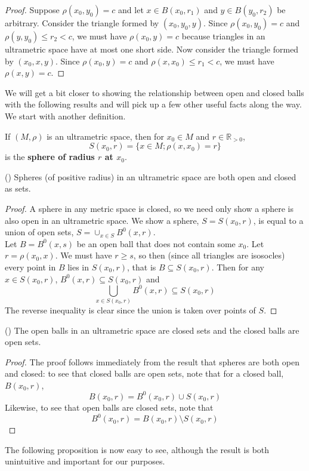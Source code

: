 \begin{proof}
Suppose $\rho(x_0, y_0)=c$ and let $x \in B(x_0, r_1)$ and $y \in B(y_0, r_2)$ be arbitrary. Consider the triangle formed by $(x_0, y_0,y)$. Since $\rho(x_0,y_0)=c$ and  $\rho(y,y_0) \leq r_2 < c$, we must have $\rho(x_0, y)=c$ because triangles in an ultrametric space have at most one short side. Now consider the triangle formed by  $(x_0, x,y)$. Since $\rho(x_0, y)=c$ and  $\rho(x,x_0) \leq r_1 < c$, we must have $\rho(x, y)=c$.
\end{proof}

We will get a bit closer to showing the relationship between open and closed balls with the following results and will pick up a few other useful facts along the way. We start with another definition.\\

\begin{definition}
	If $(M, \rho)$ is an ultrametric space, then for $x_0 \in M$ and $r \in \mathbb{R}_{> 0 }$, \[S(x_0,r) = \{x \in M; \rho(x,x_0) =r \}\] is the \textbf{sphere of radius $r$ at $x_0$}.
\end{definition}

\begin{lemma}
 (\cite{ar}) Spheres (of positive radius) in an ultrametric space are both open and closed as sets.
\end{lemma}

\begin{proof}
	\cite{ar} A sphere in any metric space is closed, so we need only show a sphere is also open in an ultrametric space. We show a sphere, $S=S(x_0,r)$, is equal to a union of open sets, $S = \cup_{x\in S} B^0(x,r)$.\\
	
	Let $B=B^0(x,s)$ be an open ball that does not contain some $x_0$. Let $r=\rho(x_0,x)$. We must have $r \geq s$, so then (since all triangles are isosocles) every point in $B$ lies in $S(x_0,r)$, that is $B \subseteq S(x_0,r)$. Then for any $x \in S(x_0,r)$, $B^0(x,r) \subseteq S(x_0,r)$ and \[\bigcup_{x \in S(x_0,r)} B^0(x,r) \subseteq S(x_0,r)\] The reverse inequality is clear since the union is taken over points of $S$.
\end{proof}

\begin{proposition}
	(\cite{ar}) The open balls in an ultrametric space are closed sets and the closed balls are open sets.
\end{proposition}

\begin{proof}
	The proof follows immediately from the result that spheres are both open and closed: to see that closed balls are open sets, note that for a closed ball, $B(x_0,r)$, \[B(x_0,r) = B^0(x_0,r) \cup S(x_0,r)\] Likewise, to see that open balls are closed sets, note that \[B^0(x_0,r) = B(x_0,r) \setminus S(x_0,r)\]
\end{proof}
The following proposition is now easy to see, although the result is both unintuitive and important for our purposes. \\

